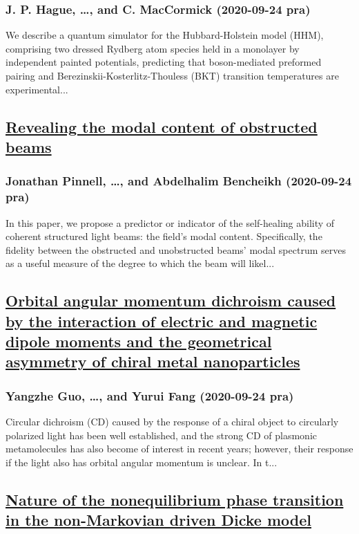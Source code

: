 \subsubsection*{J. P. Hague, \dots, and C. MacCormick (2020-09-24 pra)}
We describe a quantum simulator for the Hubbard-Holstein model (HHM), comprising two dressed Rydberg atom species held in a monolayer by independent painted potentials, predicting that boson-mediated preformed pairing and Berezinskii-Kosterlitz-Thouless (BKT) transition temperatures are experimental...
\subsection*{\href{http://link.aps.org/doi/10.1103/PhysRevA.102.033524}{Revealing the modal content of obstructed beams}}
\subsubsection*{Jonathan Pinnell, \dots, and Abdelhalim Bencheikh (2020-09-24 pra)}
In this paper, we propose a predictor or indicator of the self-healing ability of coherent structured light beams: the field's modal content. Specifically, the fidelity between the obstructed and unobstructed beams' modal spectrum serves as a useful measure of the degree to which the beam will likel...
\subsection*{\href{http://link.aps.org/doi/10.1103/PhysRevA.102.033525}{Orbital angular momentum dichroism caused by the interaction of electric and magnetic dipole moments and the geometrical asymmetry of chiral metal nanoparticles}}
\subsubsection*{Yangzhe Guo, \dots, and Yurui Fang (2020-09-24 pra)}
Circular dichroism (CD) caused by the response of a chiral object to circularly polarized light has been well established, and the strong CD of plasmonic metamolecules has also become of interest in recent years; however, their response if the light also has orbital angular momentum is unclear. In t...
\subsection*{\href{http://link.aps.org/doi/10.1103/PhysRevA.102.032218}{Nature of the nonequilibrium phase transition in the non-Markovian driven Dicke model}}
